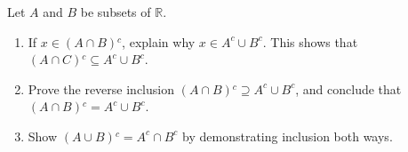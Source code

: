 \documentclass[class=understanding-analysis,crop=false]{standalone}
\begin{document}
\begin{exercise}
    \par Let $A$ and $B$ be subsets of $\mathbb{R}$.
    \begin{enumerate}[label = (\alph*)]
        \item If $x\in (A\cap B){}^{c}$, explain why $x\in A^{c}\cup B^{c}$. This shows that $(A\cap C){}^{c} \subseteq A^{c}\cup B^{c}$.
        \item Prove the reverse inclusion $(A\cap B){}^{c}\supseteq A^{c}\cup B^{c}$, and conclude that $(A\cap B){}^{c} = A^{c}\cup B^{c}$.
        \item Show $(A\cup B){}^{c} = A^{c}\cap B^{c}$ by demonstrating inclusion both ways.
    \end{enumerate}
\end{exercise}
\end{document}
